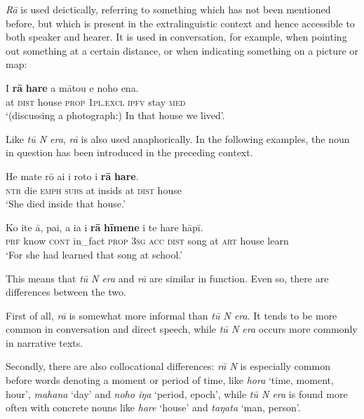 \textit{Rā} is used deictically, referring to something which has not been mentioned before, but which is present in the extralinguistic context and hence accessible to both speaker and hearer. It is used in conversation, for example, when pointing out something at a certain distance, or when indicating something on a picture or map:

\ea\label{ex:4.215}
\gll {\ꞌ}I \textbf{rā} \textbf{hare} a mātou e noho ena. \\
at \textsc{dist} house \textsc{prop} \textsc{1pl.excl} \textsc{ipfv} stay \textsc{med} \\

\glt
‘(discussing a photograph:) In that house we lived’. \textstyleExampleref{[R416.961]} 
\z

Like \textit{tū N era}, \textit{rā} is also used anaphorically. In the following examples, the noun in question has been introduced in the preceding context. 

\ea\label{ex:4.216}
\gll He mate rō {\ꞌ}ai {\ꞌ}i roto {\ꞌ}i \textbf{rā} \textbf{hare}. \\
\textsc{ntr} die \textsc{emph} \textsc{subs} at insids at \textsc{dist} house \\

\glt 
‘She died inside that house.’ \textstyleExampleref{[R532-14.034]}
\z

\ea\label{ex:4.217}
\gll Ko {\ꞌ}ite {\ꞌ}ā, pa{\ꞌ}i, a ia i \textbf{rā} \textbf{hīmene} {\ꞌ}i te hare hāpī. \\
\textsc{prf} know \textsc{cont} in\_fact \textsc{prop} \textsc{3sg} \textsc{acc} \textsc{dist} song at \textsc{art} house learn \\

\glt
‘For she had learned that song at school.’ \textstyleExampleref{[R334.341]} 
\z

This means that \textit{tū} \textit{N era} and \textit{rā} are similar in function. Even so, there are differences between the two. 

First of all, \textit{rā} is somewhat more informal than \textit{tū N era}. It tends to be more common in conversation and direct speech, while \textit{tū N era} occurs more commonly in narrative texts.

Secondly, there are also collocational differences: \textit{rā N} is especially common before words denoting a moment or period of time, like \textit{hora} ‘time, moment, hour’, \textit{mahana} ‘day’ and \textit{noho iŋa} ‘period, epoch’, while \textit{tū N era} is found more often with concrete nouns like \textit{hare} ‘house’ and \textit{taŋata} ‘man, person’. 

